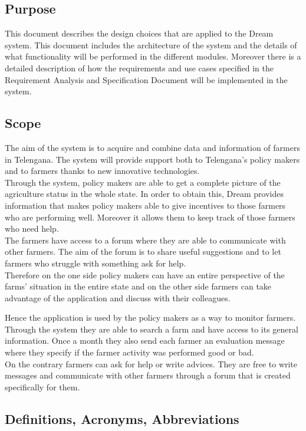 \subsection{Purpose}
This document describes the design choices that are applied to the Dream system.
This document includes the architecture of the system and the details of what functionality will be performed in the different modules. 
Moreover there is a detailed description of how the requirements and use cases specified in the 
Requirement Analysis and Specification Document will be implemented in the system.
\subsection{Scope}
The aim of the system is to acquire and combine data and information of farmers in Telengana. 
The system will provide support both to Telengana’s policy makers and to farmers 
thanks to new innovative technologies.\\
Through the system, policy makers are able 
to get a complete picture of the agriculture status in the whole state. In order 
to obtain this, Dream provides information that makes policy makers able to give 
incentives to those farmers who are performing well. Moreover it allows them to 
keep track of those farmers who need help. \\
The farmers have access to a forum where they are able to communicate with other 
farmers. The aim of the forum is to share useful suggestions and to let farmers 
who struggle with something ask for help. \\
Therefore on the one side policy makers can have an entire perspective of the farms’ 
situation in the entire state and on the other side farmers can take advantage of the 
application and discuss with their colleagues.
\par 
Hence the application is used by the policy makers as a way to monitor farmers. 
Through the system they are able to search a farm and have access to its general information. 
Once a month they also send each farmer an evaluation message where they specify if the farmer activity was
performed good or bad.\\
On the contrary farmers can ask for help or write advices. They are free to write messages and communicate with other farmers through a forum 
that is created specifically for them.
\subsection{Definitions, Acronyms, Abbreviations}

